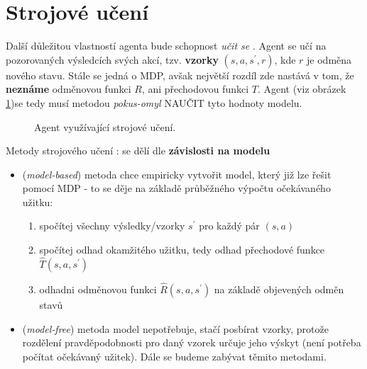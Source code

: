 \section{Strojové učení}
\label{sec:rl}
Další důležitou vlastností agenta bude schopnost \textit{učit se} \cite{RLIntro}. Agent se učí na pozorovaných výsledcích svých akcí, tzv. \textbf{vzorky} $(s,a,s^\prime,r)$, kde $r$ je odměna nového stavu. Stále se jedná o MDP, avšak největší rozdíl zde nastává v tom, že \textbf{neznáme} odměnovou funkci \boldmath$R$, ani přechodovou funkci \boldmath$T$. Agent (viz obrázek \ref{img:learningagent})se tedy musí metodou \textit{pokus-omyl} NAUČIT tyto hodnoty modelu.

\begin{figure}[!htbp]
\begin{center}
	\caption{Agent využívající strojové učení.}
	\label{img:learningagent}
\end{center}
\end{figure}

Metody strojového učení \cite{RLIntro}: se dělí dle \textbf{závislosti na modelu}
\begin{itemize}
\item (\textit{model-based}) metoda chce empiricky vytvořit model, který již lze řešit pomocí MDP - to se děje na základě průběžného výpočtu očekávaného užitku: 
\begin{enumerate}
\item spočítej všechny výsledky/vzorky $s^\prime$ pro každý pár $(s,a)$
\item spočítej odhad okamžitého užitku, tedy odhad přechodové funkce $\hat{T}(s,a,s^\prime)$
\item odhadni odměnovou funkci $\hat{R}(s,a,s^\prime)$ na základě objevených odměn stavů
\end{enumerate}
\item (\textit{model-free}) metoda model nepotřebuje, stačí posbírat vzorky, protože rozdělení pravděpodobnosti pro daný vzorek určuje jeho výskyt (není potřeba počítat očekávaný užitek). Dále se budeme zabývat těmito metodami.
\end{itemize}

